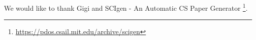 \begin{acknowledgements}
	We would like to thank Gigi and SCIgen - An Automatic CS Paper Generator%
	\footnote{\url{https://pdos.csail.mit.edu/archive/scigen}}.
\end{acknowledgements}
